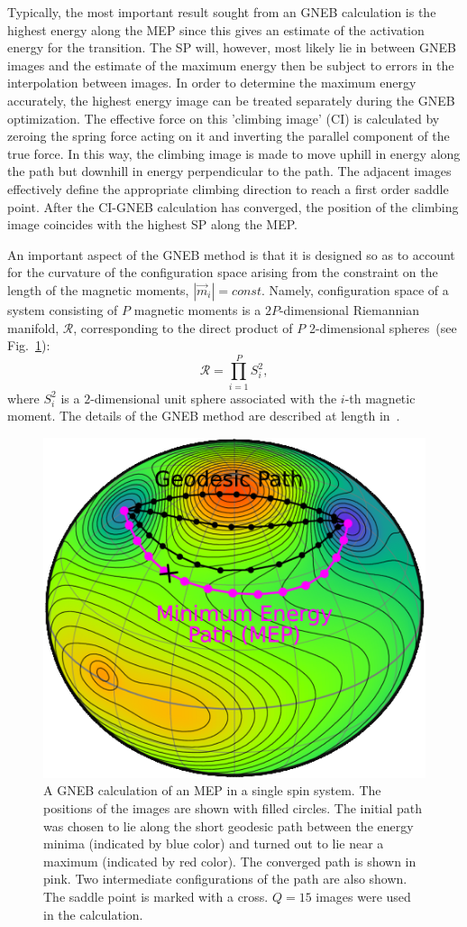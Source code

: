\documentclass{article}
\begin{document}
Typically, the most important result sought from an GNEB calculation
is the highest energy along the MEP since this gives an estimate of the
activation energy for the transition. The SP will, however, most
likely lie in between GNEB images and the estimate of the maximum energy
then be subject to errors in the interpolation between images. In order to
determine the maximum energy accurately, the highest energy image can be
treated separately during the GNEB optimization. The effective force on this 'climbing image'
(CI) is calculated by zeroing the spring force acting on it and inverting the
parallel component of the true force. In this way, the climbing image is made to move uphill in energy along
the path but downhill in energy perpendicular to the path. The adjacent
images effectively define the appropriate
climbing direction to reach a first order saddle point. After the CI-GNEB
calculation has converged, the position of the climbing image coincides with
the highest SP along the MEP.

An important aspect of the GNEB method is that it is designed so as to account for the curvature of the configuration space arising from the constraint on the length of the magnetic moments, $|\vec{m}_i|=const$. Namely, configuration space of a system consisting of $P$ magnetic moments is a $2P$-dimensional Riemannian manifold, $\mathcal{R}$, corresponding to the direct product of $P$ 2-dimensional spheres~(see Fig.~\ref{fig:1}):
%
\begin{equation}
\label{eq:conf_space}
\mathcal{R} = \prod_{i=1}^P S_i^2,
\end{equation}
%
where $S_i^2$ is a $2$-dimensional unit sphere associated with the $i$-th magnetic moment. The details of the GNEB method are described at length in~\cite{bessarab_2015}.
\begin{figure}[h!]
\centering
\includegraphics[width=0.7\columnwidth]{fig1.png}
\caption{
A GNEB calculation of an MEP in a single spin system. The positions of the images are shown with filled circles. 
The initial path was chosen to lie 
along the short geodesic path between the energy minima (indicated by blue color) 
and turned out to lie near a maximum (indicated by red color). 
The converged path is shown in pink. 
Two intermediate configurations of the path are also shown. The saddle point is marked with a cross.
$Q=15$ images were used in the calculation. 
}
\label{fig:1}
\end{figure}
\end{document}
